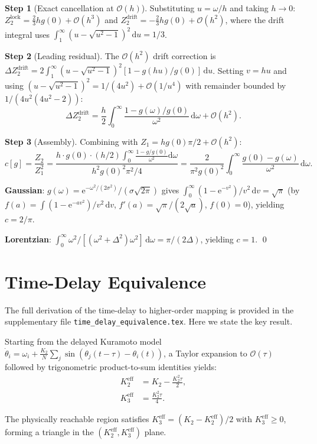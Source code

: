 \documentclass{article}
\newcommand{\dd}{\mathrm{d}}
\newcommand{\ee}{\mathrm{e}}
\newcommand{\Order}{\mathcal{O}}
\begin{document}
\textbf{Step 1} (Exact cancellation at $\Order(h)$).
Substituting $u=\omega/h$ and taking $h\to 0$:
$Z_2^{\mathrm{lock}} = \tfrac{2}{3}hg(0) + \Order(h^3)$ and
$Z_2^{\mathrm{drift}} = -\tfrac{2}{3}hg(0) + \Order(h^2)$,
where the drift integral uses
$\int_1^\infty(u-\sqrt{u^2-1})^2\,\dd u = 1/3$.

\textbf{Step 2} (Leading residual).
The $\Order(h^2)$ drift correction is
$\Delta Z_2^{\mathrm{drift}} = 2\int_1^\infty(u-\sqrt{u^2-1})^2
[1-g(hu)/g(0)]\,\dd u$.
Setting $v=hu$ and using
$(u-\sqrt{u^2-1})^2 = 1/(4u^2) + \Order(1/u^4)$
with remainder bounded by $1/(4u^2(4u^2-2))$:
\[
  \Delta Z_2^{\mathrm{drift}}
  = \frac{h}{2}\int_0^\infty\frac{1-g(\omega)/g(0)}{\omega^2}\,\dd\omega
  + \Order(h^2).
\]

\textbf{Step 3} (Assembly).
Combining with $Z_1 = hg(0)\pi/2 + \Order(h^2)$:
\[
  c[g] = \frac{Z_2}{Z_1^2}
  = \frac{h\cdot g(0)\cdot(h/2)\int_0^\infty\frac{1-g/g(0)}{\omega^2}\dd\omega}
         {h^2 g(0)^2 \pi^2/4}
  = \frac{2}{\pi^2 g(0)^2}\int_0^\infty\frac{g(0)-g(\omega)}{\omega^2}\,\dd\omega.
\]

\textbf{Gaussian}: $g(\omega)=\ee^{-\omega^2/(2\sigma^2)}/(\sigma\sqrt{2\pi})$
gives $\int_0^\infty(1-\ee^{-v^2})/v^2\,\dd v = \sqrt\pi$
(by $f(a)=\int(1-\ee^{-av^2})/v^2\,\dd v$, $f'(a)=\sqrt\pi/(2\sqrt a)$,
$f(0)=0$), yielding $c=2/\pi$.

\textbf{Lorentzian}: $\int_0^\infty\omega^2/[(\omega^2+\Delta^2)\omega^2]\,\dd\omega
= \pi/(2\Delta)$, yielding $c=1$. \qed


\section{Time-Delay Equivalence}
\label{app:time-delay}

The full derivation of the time-delay to higher-order mapping is provided in
the supplementary file \texttt{time\_delay\_equivalence.tex}.  Here we state
the key result.

Starting from the delayed Kuramoto model
$\dot{\theta}_i = \omega_i + \frac{K_2}{N}\sum_j\sin(\theta_j(t-\tau)-\theta_i(t))$,
a Taylor expansion to $\Order(\tau)$ followed by trigonometric product-to-sum
identities yields:
\begin{align}
  K_2^{\mathrm{eff}} &= K_2 - \frac{K_2^2\tau}{2}, \\
  K_3^{\mathrm{eff}} &= \frac{K_2^2\tau}{4}.
\end{align}

The physically reachable region satisfies
$K_3^{\mathrm{eff}} = (K_2-K_2^{\mathrm{eff}})/2$ with $K_3^{\mathrm{eff}}\ge 0$,
forming a triangle in the $(K_2^{\mathrm{eff}}, K_3^{\mathrm{eff}})$ plane.
\end{document}
